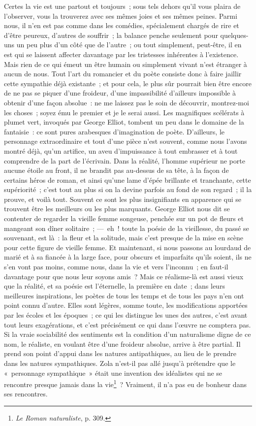 \documentclass[french,twoside]{book} %
\begin{document}
\noindent Certes la vie est une partout et toujours ; sous tels dehors qu’il vous plaira de l’observer, vous la trouverez avec ses mêmes joies et ses mêmes peines. Parmi nous, il n’en est pas comme dans les comédies, spécialement chargés de rire et d’être peureux, d’autres de souffrir ; la balance penche seulement pour quelques-uns un peu plus d’un côté que de l’autre ; ou tout simplement, peut-être, il en est qui se laissent affecter davantage par les tristesses inhérentes à l’existence. Mais rien de ce qui émeut un être humain ou simplement vivant n’est étranger à aucun de nous. Tout l’art du romancier et du poète consiste donc à faire jaillir cette sympathie déjà existante ; et pour cela, le plus sûr pourrait bien être encore de ne pas se piquer d’une froideur, d’une impassibilité d’ailleurs impossible à obtenir d’une façon absolue : ne me laissez pas le soin de découvrir, montrez-moi les choses ; soyez ému le premier et je le serai aussi. Les magnifiques scélérats à plumet vert, invoqués par George Elliot, tombent un peu dans le domaine de la fantaisie : ce sont pures arabesques d’imagination de poète. D’ailleurs, le personnage extraordinaire et tout d’une pièce n’est souvent, comme nous l’avons montré déjà, qu’un artifice, un aveu d’impuissance à tout embrasser et à tout comprendre de la part de l’écrivain. Dans la réalité, l’homme supérieur ne porte aucune étoile au front, il ne brandit pas au-dessus de sa tête, à la façon de certains héros de roman, et ainsi qu’une lame d’épée brillante et tranchante, cette supériorité ; c’est tout au plus si on la devine parfois au fond de son regard ; il la prouve, et voilà tout. Souvent ce sont les plus insignifiants en apparence qui se trouvent être les meilleurs ou les plus marquants. George Elliot nous dit se contenter de regarder la vieille femme songeuse, penchée sur un pot de fleurs et mangeant son dîner solitaire ; — eh ! toute la poésie de la vieillesse, du passé se souvenant, est là : la fleur et la solitude, mais c’est presque de la mise en scène pour cette figure de vieille femme. Et maintenant, si nous passons au lourdaud de marié et à sa fiancée à la large face, pour obscurs et imparfaits qu’ils soient, ils ne s’en vont pas moins, comme nous, dans la vie et vers l’inconnu ; en faut-il davantage pour que nous leur soyons amis ? Mais ce réalisme-là est aussi vieux que la réalité, et sa poésie est l’éternelle, la première en date ; dans leurs meilleures inspirations, les poètes de tous les temps et de tous les pays n’en ont point connu d’autre. Elles sont légères, somme toute, les modifications apportées par les écoles et les époques ; ce qui les distingue les unes des autres, c’est avant tout leurs exagérations, et c’est précisément ce qui dans l’œuvre ne comptera pas. Si la vraie sociabilité des sentiments est la condition d’un naturalisme digne de ce nom, le réaliste, en voulant être d’une froideur absolue, arrive à être partial. Il prend son point d’appui dans les natures antipathiques, au lieu de le prendre dans les natures sympathiques. Zola n’est-il pas allé jusqu’à prétendre que le « personnage sympathique » était une invention des idéalistes qui ne se rencontre presque jamais dans la vie\footnote{\emph{Le Roman naturaliste}, p. 309.} ? Vraiment, il n’a pas eu de bonheur dans ses rencontres.\par
\end{document}
